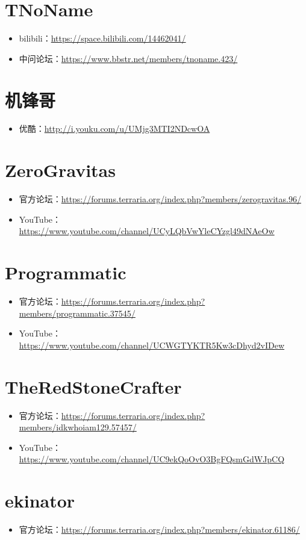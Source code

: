 \section{TNoName}
\begin{itemize}
    \item bilibili：\url{https://space.bilibili.com/14462041/}
    \item 中问论坛：\url{https://www.bbstr.net/members/tnoname.423/}
\end{itemize}
\section{机锋哥}
\begin{itemize}
    \item 优酷：\url{http://i.youku.com/u/UMjg3MTI2NDcwOA}
\end{itemize}
\section{ZeroGravitas}
\begin{itemize}
    \item 官方论坛：\url{https://forums.terraria.org/index.php?members/zerogravitas.96/}
    \item YouTube：\url{https://www.youtube.com/channel/UCyLQbVwYleCYzgl49dNAeOw}
\end{itemize}
\section{Programmatic}
\begin{itemize}
    \item 官方论坛：\url{https://forums.terraria.org/index.php?members/programmatic.37545/}
    \item YouTube：\url{https://www.youtube.com/channel/UCWGTYKTR5Kw3cDhyd2vIDew}
\end{itemize}
\section{TheRedStoneCrafter}
\begin{itemize}
    \item 官方论坛：\url{https://forums.terraria.org/index.php?members/idkwhoiam129.57457/}
    \item YouTube：\url{https://www.youtube.com/channel/UC9ekQoOvO3BgFQsmGdWJpCQ}
\end{itemize}
\section{ekinator}
\begin{itemize}
    \item 官方论坛：\url{https://forums.terraria.org/index.php?members/ekinator.61186/}
\end{itemize}
